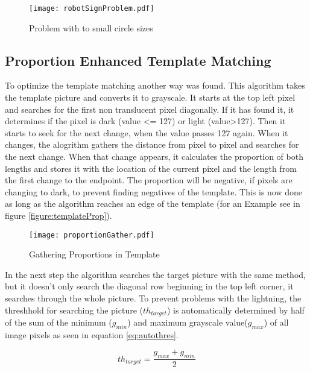 \begin{figure}[H]
\begin{center}
  \texttt{[image: robotSignProblem.pdf]}
  \caption{Problem with to small circle sizes}
  \label{figure:problemCircles}
\end{center}
\end{figure}

\subsection{Proportion Enhanced Template Matching}
To optimize the template matching another way was found. This algorithm
takes the template picture and converts it to grayscale. It starts at the top left pixel
and searches for the first non translucent pixel diagonally. If it has found it,
it determines if the pixel is dark (value <= 127) or light (value>127). Then it
starts to seek for the next change, when the value passes 127 again.
When it changes, the alogrithm gathers the distance from pixel to pixel and searches for the next change.
When that change appears, it calculates the proportion of both lengths and stores it 
with the location of the current pixel and the length from the first change to the endpoint. 
The proportion will be negative, if pixels are changing to dark, to prevent finding negatives of the template. 
This is now done as long as the algorithm reaches an edge of the template 
(for an Example see in figure \vref{figure:templateProp}).

\begin{figure}[H]
\begin{center}
  \texttt{[image: proportionGather.pdf]}
  \caption{Gathering Proportions in Template}
  \label{figure:templateProp}
\end{center}
\end{figure}

In the next step the algorithm searches the target picture with the same method, but
it doesn't only search the diagonal row beginning in the top left corner, it searches
through the whole picture. To prevent problems with the lightning, the threshhold
for searching the picture ($th_{target}$) is automatically determined by half of the sum of the 
minimum ($g_{min}$) and maximum grayscale value($g_{max}$) of all image pixels
as seen in equation \vref{eq:autothres}.

	\begin{equation}
		th_{target}=\frac{g_{max}+g_{min}}{2}
		\label{eq:autothres}
	\end{equation}

